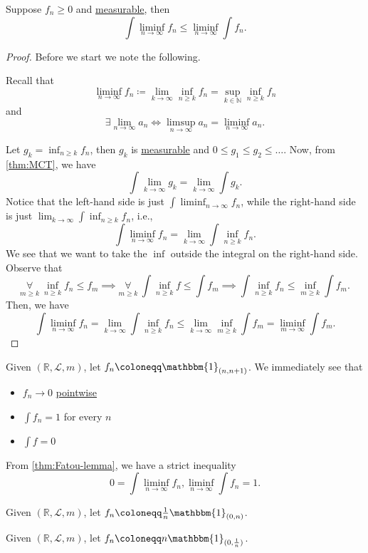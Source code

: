 \begin{theorem}\label{thm:Fatou-lemma}
	Suppose \(f_{n}\geq 0\) and \hyperref[def:measurable-function]{measurable}, then
	\[
		\int \liminf_{n \to \infty} f_{n}\leq \liminf_{n \to \infty} \int f_{n}.
	\]
\end{theorem}
\begin{proof}
	Before we start we note the following.
	\begin{remark}
		Recall that
		\[
			\liminf_{n \to \infty} f_{n} \coloneqq \lim_{k \to \infty} \inf_{n\geq k}f_{n} = \sup _{k\in\mathbb{N} }\inf _{n\geq k}f_{n}
		\]
		and
		\[
			\exists\lim_{n \to \infty} a_{n}\iff \limsup_{n \to \infty} a_{n} = \liminf_{n \to \infty} a_{n}.
		\]
	\end{remark}
	Let \(g_{k} = \inf _{n\geq k}f_{n}\), then \(g_{k}\) is \hyperref[def:measurable-function]{measurable} and \(0\leq g_1 \leq g_2 \leq \dots  \). Now, from \autoref{thm:MCT}, we have
	\[
		\int \lim_{k \to \infty}  g_{k} = \lim_{k \to \infty} \int g_{k}.
	\]
	Notice that the left-hand side is just \(\int \liminf_{n \to \infty} f_{n}\), while the right-hand side is just \(\lim_{k \to \infty} \int \inf _{n\geq k}f_{n}\),
	i.e.,
	\[
		\int \liminf_{n \to \infty} f_{n} = \lim_{k \to \infty} \int \inf _{n\geq k}f_{n}.
	\]
	We see that we want to take the \(\inf\) outside the integral on the right-hand side. Observe that
	\[
		\underset{m\geq k}{\forall }\ \inf _{n\geq k}f_{n}\leq f _{m} \implies \underset{m\geq k}{\forall }\ \int \inf _{n\geq k}f\leq \int f _{m}\implies \int \inf _{n\geq k}f_{n}\leq \inf_{m\geq k}\int f _{m}.
	\]
	Then, we have
	\[
		\int \liminf_{n \to \infty} f_{n} = \lim_{k \to \infty} \int \inf _{n\geq k}f_{n}\leq \lim_{k \to \infty} \inf _{m\geq k}\int f _{m} = \liminf_{m \to \infty} \int f _{m}.
	\]
\end{proof}
\begin{eg}
	Given \((\mathbb{R} , \mathcal{L} , m)\), let \(f_{n}\coloneqq \mathbbm{1}_{(n, n+1)} \). We immediately see that
	\begin{itemize}
		\item \(f_{n}\to 0\) \hyperref[def:pointwise-convergence]{pointwise}
		\item \(\int f_{n} = 1\) for every \(n\)
		\item \(\int f = 0\)
	\end{itemize}
	From \autoref{thm:Fatou-lemma}, we have a strict inequality
	\[
		0 = \int \liminf_{n \to \infty} f_{n} , \liminf_{n \to \infty} \int f_{n} = 1.
	\]
\end{eg}
\begin{eg}
	Given \((\mathbb{R} , \mathcal{L} , m)\), let \(f_{n}\coloneqq \frac{1}{n}\mathbbm{1}_{(0, n)} \).
\end{eg}
\begin{eg}
	Given \((\mathbb{R} , \mathcal{L} , m)\), let \(f_{n}\coloneqq n \mathbbm{1}_{(0, \frac{1}{n})} \).
\end{eg}

